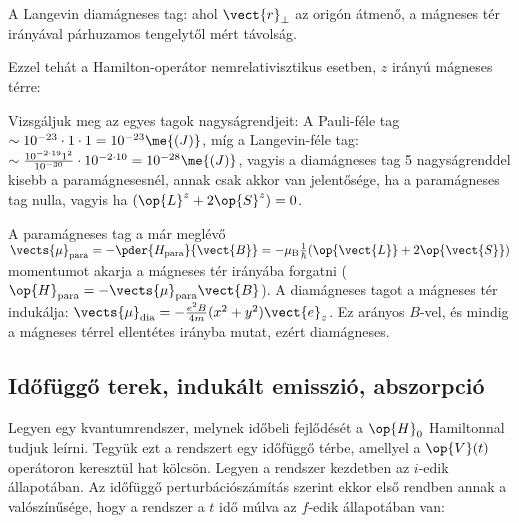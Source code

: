    A Langevin diamágneses tag:
   ahol $\vect{r}_\perp$ az origón átmenő, a mágneses tér irányával párhuzamos tengelytől mért távolság. 
   
   Ezzel tehát a Hamilton-operátor nemrelativisztikus esetben, $z$ irányú mágneses térre:
   
   Vizsgáljuk meg az egyes tagok nagyságrendjeit: A Pauli-féle tag $\sim 10^{-23}\cdot 1\cdot 1=10^{-23}\me{(J)}$, míg a Langevin-féle tag: $\sim \frac{10^{-2\cdot 19} 1^2}{10^{-30}}\cdot 10^{-2\cdot 10}=10^{-28}\me{(J)}$, vagyis a diamágneses tag 5 nagyságrenddel kisebb a paramágnesesnél, annak csak akkor van jelentősége, ha a paramágneses tag nulla, vagyis ha $(\op{L}^z+2\op{S}^z)=0$.
   
   A paramágneses tag a már meglévő $\vects{\mu}_\text{para}=-\pder{H_\text{para}}{\vect{B}}=-\mu_\text{B}\frac{1}{\hbar}(\op{\vect{L}}+2\op{\vect{S}})$ momentumot akarja a mágneses tér irányába forgatni ($\op{H}_\text{para}=-\vects{\mu}_\text{para}\vect{B}$).
   A diamágneses tagot a mágneses tér indukálja: $\vects{\mu}_\text{dia}=-\frac{e^2B}{4m}(x^2+y^2)\vect{e}_z$.
   Ez arányos $B$-vel, és mindig a mágneses térrel ellentétes irányba mutat, ezért diamágneses.
   
  \subsection{Időfüggő terek, indukált emisszió, abszorpció}

   Legyen egy kvantumrendszer, melynek időbeli fejlődését a $\op{H}_0$ Hamiltonnal tudjuk leírni.
   Tegyük ezt a rendszert egy időfüggő térbe, amellyel a $\op{V}(t)$ operátoron keresztül hat kölcsön.
   Legyen a rendszer kezdetben az $i$-edik állapotában.
   Az időfüggő perturbációszámítás szerint ekkor első rendben annak a valószínűsége, hogy a rendszer a $t$ idő múlva az $f$-edik állapotában van:
   

